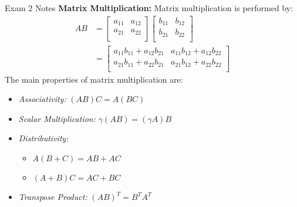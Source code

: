 \begin{examnotes}{Exam 2 Notes}
    \textbf{Matrix Multiplication:} Matrix multiplication is performed by:
    \begin{align*}
        AB & = 
        \begin{bmatrix}
            a_{11} & a_{12} \\
            a_{21} & a_{22} \\
        \end{bmatrix}
        \begin{bmatrix}
            b_{11} & b_{12} \\
            b_{21} & b_{22} \\
        \end{bmatrix} \\
        & = 
        \begin{bmatrix}
            a_{11}b_{11} + a_{12}b_{21} & a_{11}b_{12} + a_{12}b_{22} \\
            a_{21}b_{11} + a_{22}b_{21} & a_{21}b_{12} + a_{22}b_{22} \\
        \end{bmatrix}
    \end{align*}
    The main properties of matrix multiplication are:
    \begin{itemize}
        \item \textit{Associativity:} $(AB)C = A(BC)$
        \item \textit{Scalar Multiplication:} $\gamma(AB) = (\gamma A)B$
        \item \textit{Distributivity:}
        \begin{itemize}
            \item $A(B + C) = AB + AC$
            \item $(A + B)C = AC + BC$
        \end{itemize}
        \item \textit{Transpose Product:} $(AB)^{T} = B^{T}A^{T}$
    \end{itemize}


\end{examnotes}

